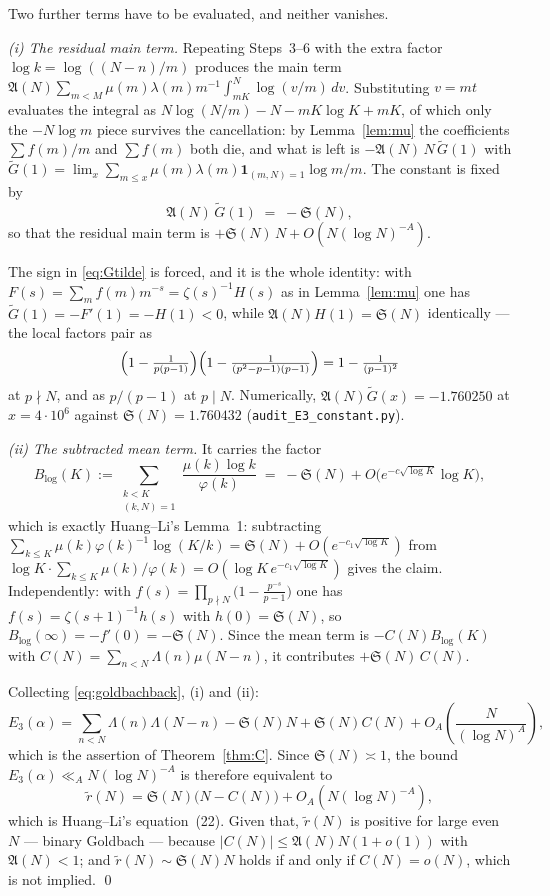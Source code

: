 \documentclass[11pt,a4paper]{article}
\theoremstyle{plain}
\theoremstyle{definition}
\theoremstyle{remark}
\renewcommand{\SS}{\mathfrak{S}}
\newcommand{\AAA}{\mathfrak{A}}
\begin{document}
Two further terms have to be evaluated, and neither vanishes.

\medskip\noindent
\emph{(i) The residual main term.} Repeating Steps~3--6 with the extra
factor $\log k=\log((N-n)/m)$ produces the main term
$\AAA(N)\sum_{m<M}\mu(m)\lambda(m)m^{-1}\int_{mK}^{N}\log(v/m)\,dv$.
Substituting $v=mt$ evaluates the integral as
$N\log(N/m)-N-mK\log K+mK$, of which only the $-N\log m$ piece
survives the cancellation: by Lemma~\ref{lem:mu} the coefficients
$\sum f(m)/m$ and $\sum f(m)$ both die, and what is left is
$-\AAA(N)\,N\,\widetilde G(1)$ with
$\widetilde G(1)=\lim_x\sum_{m\le x}\mu(m)\lambda(m)
\mathbf 1_{(m,N)=1}\log m/m$. The constant is fixed by
\begin{equation}\label{eq:Gtilde}
  \AAA(N)\,\widetilde G(1)\;=\;-\SS(N),
\end{equation}
so that the residual main term is $+\SS(N)\,N+O(N(\log N)^{-A})$.

The sign in \eqref{eq:Gtilde} is forced, and it is the whole identity:
with $F(s)=\sum_m f(m)m^{-s}=\zeta(s)^{-1}H(s)$ as in
Lemma~\ref{lem:mu} one has $\widetilde G(1)=-F'(1)=-H(1)<0$, while
$\AAA(N)H(1)=\SS(N)$ identically --- the local factors pair as
\[
  \Bigl(1-\tfrac{1}{p(p-1)}\Bigr)
  \Bigl(1-\tfrac{1}{(p^2-p-1)(p-1)}\Bigr)
  =1-\tfrac{1}{(p-1)^2}
\]
at $p\nmid N$, and as $p/(p-1)$ at $p\mid N$. Numerically,
$\AAA(N)\widetilde G(x)=-1.760250$ at $x=4\cdot10^6$ against
$\SS(N)=1.760432$ (\texttt{audit\_E3\_constant.py}).

\medskip\noindent
\emph{(ii) The subtracted mean term.} It carries the factor
\[
  B_{\log}(K):=\sum_{\substack{k<K\\ (k,N)=1}}
     \frac{\mu(k)\log k}{\varphi(k)}
  \;=\;-\SS(N)+O\bigl(e^{-c\sqrt{\log K}}\log K\bigr),
\]
which is exactly Huang--Li's Lemma~1: subtracting
$\sum_{k\le K}\mu(k)\varphi(k)^{-1}\log(K/k)
 =\SS(N)+O(e^{-c_1\sqrt{\log K}})$ from
$\log K\cdot\sum_{k\le K}\mu(k)/\varphi(k)
 =O(\log K\,e^{-c_1\sqrt{\log K}})$ gives the claim. Independently:
with $f(s)=\prod_{p\nmid N}\bigl(1-\frac{p^{-s}}{p-1}\bigr)$ one has
$f(s)=\zeta(s+1)^{-1}h(s)$ with $h(0)=\SS(N)$, so
$B_{\log}(\infty)=-f'(0)=-\SS(N)$. Since the mean term is
$-C(N)B_{\log}(K)$ with $C(N)=\sum_{n<N}\Lambda(n)\mu(N-n)$, it
contributes $+\SS(N)\,C(N)$.

\medskip
Collecting \eqref{eq:goldbachback}, (i) and (ii):
\[
  E_3(\alpha)=\sum_{n<N}\Lambda(n)\Lambda(N-n)
    -\SS(N)N+\SS(N)C(N)+O_A\!\left(\frac{N}{(\log N)^{A}}\right),
\]
which is the assertion of Theorem~\ref{thm:C}. Since $\SS(N)\asymp1$,
the bound $E_3(\alpha)\ll_A N(\log N)^{-A}$ is therefore equivalent to
\[
  \tilde r(N)=\SS(N)\bigl(N-C(N)\bigr)+O_A\!\left(N(\log N)^{-A}\right),
\]
which is Huang--Li's equation~(22). Given that, $\tilde r(N)$ is
positive for large even $N$ --- binary Goldbach --- because
$|C(N)|\le\AAA(N)N(1+o(1))$ with $\AAA(N)<1$; and
$\tilde r(N)\sim\SS(N)N$ holds if and only if $C(N)=o(N)$, which is
not implied. \qed
\end{document}
